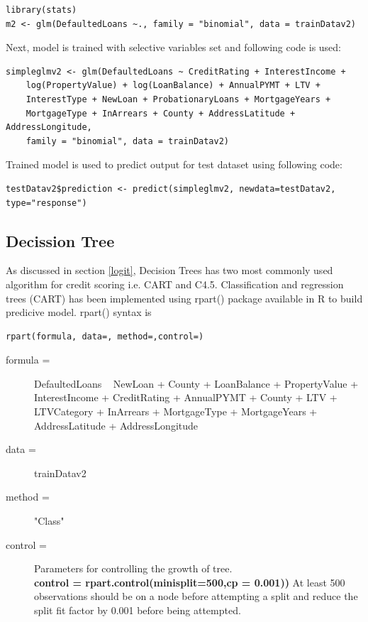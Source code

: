 \begin{verbatim}
library(stats)
m2 <- glm(DefaultedLoans ~., family = "binomial", data = trainDatav2)
\end{verbatim}

Next, model is trained with selective variables set and following code is used:

\begin{verbatim}
simpleglmv2 <- glm(DefaultedLoans ~ CreditRating + InterestIncome + 
    log(PropertyValue) + log(LoanBalance) + AnnualPYMT + LTV + 
    InterestType + NewLoan + ProbationaryLoans + MortgageYears + 
    MortgageType + InArrears + County + AddressLatitude + AddressLongitude, 
    family = "binomial", data = trainDatav2)
\end{verbatim}

Trained model is used to predict output for test dataset using following code:
\begin{verbatim}
testDatav2$prediction <- predict(simpleglmv2, newdata=testDatav2,
type="response")
\end{verbatim}


\subsection{Decission Tree}

As discussed in section \ref{logit}, Decision Trees has two most commonly used algorithm for credit scoring i.e. CART and C4.5. Classification and regression trees (CART) has been implemented using rpart() package available in R to build predicive model. rpart() syntax is \begin{verbatim}
rpart(formula, data=, method=,control=)
\end{verbatim}

\begin{description}
  \item[formula =] DefaultedLoans ~ NewLoan + County + LoanBalance + PropertyValue + InterestIncome + CreditRating + AnnualPYMT + County + LTV + LTVCategory + InArrears + MortgageType + MortgageYears + AddressLatitude + AddressLongitude
  \item[data =]trainDatav2
  \item[method =] "Class"
  \item [control =] Parameters for controlling the growth of tree. \\
  \textbf{control =  rpart.control(minisplit=500,cp = 0.001))} At least 500 observations should be on a node before attempting a split and reduce the split fit factor by 0.001 before being attempted.
\end{description}


